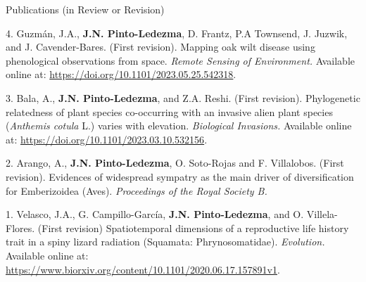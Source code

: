\documentclass{resume} %
\begin{document}

\begin{rSection}{Publications (in Review or Revision)} 

\normalfont 

{4.} {Guzmán, J.A.,} {\bf{J.N. Pinto-Ledezma}}, {D. Frantz, P.A Townsend, J. Juzwik, and J. Cavender-Bares. (First revision). Mapping oak wilt disease using phenological observations from space.} {\em Remote Sensing of Environment.} {Available online at:} \url {https://doi.org/10.1101/2023.05.25.542318}.

{3.} {Bala, A.,} {\bf{J.N. Pinto-Ledezma\dag}}, and {Z.A. Reshi\dag. (First revision). Phylogenetic relatedness of plant species co-occurring with an invasive alien plant species ({\em Anthemis cotula} L.) varies with elevation.} {\em Biological Invasions.} {Available online at:} \url {https://doi.org/10.1101/2023.03.10.532156}.

{2.} {Arango, A.,} {\bf{J.N. Pinto-Ledezma}}, { O. Soto-Rojas and F. Villalobos. (First revision). Evidences of widespread sympatry as the main driver of diversification for Emberizoidea (Aves).} {\em Proceedings of the Royal Society B.}

{1.} {Velasco, J.A., G. Campillo-García,} {\bf{J.N. Pinto-Ledezma}}, {and O. Villela-Flores. (First revision) Spatiotemporal dimensions of a reproductive life history trait in a spiny lizard radiation (Squamata: Phrynosomatidae).} {\em Evolution.} {Available online at:} \url {https://www.biorxiv.org/content/10.1101/2020.06.17.157891v1}.


\end{rSection}


\end{document}
